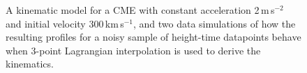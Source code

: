 \documentclass[structabstract]{aa}
\begin{document}
\begin{figure}[!t]
\caption{A kinematic model for a CME with constant acceleration 2\,m\,s$^{-2}$ and initial velocity 300\,km\,s$^{-1}$, and two data simulations of how the resulting profiles for a noisy sample of height-time datapoints behave when 3-point Lagrangian interpolation is used to derive the kinematics.}
\label{sim_vels_thesis}
\end{figure}
\end{document}
